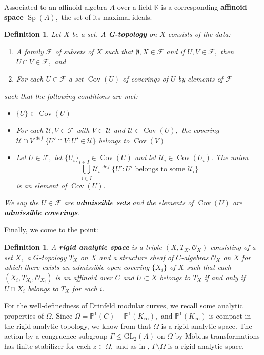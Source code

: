 \documentclass[11pt]{amsart}
\newtheorem{definition}[theorem]{Definition}
\theoremstyle{definition}
\numberwithin{equation}{section}
\newcommand{\GL}{\mathrm{GL}} 	%
\newcommand{\cO}{\mathcal{O}}		%
\newcommand{\cU}{\mathcal{U}}		%
\newcommand{\sF}{\mathscr{F}}		%
\newcommand{\bbK}{\mathbb{K}}		%
\newcommand{\bbP}{\mathbb{P}}		%
\begin{document}
		Associated to an affinoid algebra $A$ over a field $\bbK$ is a corresponding \textbf{affinoid space} $\operatorname{Sp}(A),$ the set of its maximal ideals. 
		
		\begin{definition}\cite[Definition $2.4.1$]{Frensel-vanderPut-Rigid-Analytic_Geom}
			Let $X$ be a set. A \textbf{G-topology} on $X$ consists of the data:
			\begin{enumerate}
				\item A family $\sF$ of subsets of $X$ such that $\emptyset, X\in \sF$ and if $U,V\in \sF,$ then $U\cap V\in \sF,$ and 
				\item For each $U\in \sF$ a set $\operatorname{Cov}(U)$ of coverings of $U$ by elements of $\sF$
			\end{enumerate}
			such that the following conditions are met:
			\begin{itemize}
				\item $\{U\}\in \operatorname{Cov}(U)$
				\item For each $\cU,V\in \sF$ with $V\subset \cU$ and $\cU\in \operatorname{Cov}(U),$ the covering $\displaystyle{\cU\cap V\overset{def}{=}\{U'\cap V: U'\in \cU\}}$ belongs to $\operatorname{Cov}(V)$
				\item Let $U\in \sF,$ let $\{U_i\}_{i\in I}\in \operatorname{Cov}(U)$ and let $\cU_i\in \operatorname{Cov}(U_i).$ The union \[\bigcup_{i\in I} \cU_i\overset{def}{=}\{U':U'\text{ belongs to some }\cU_i \}\] is an element of $\operatorname{Cov}(U).$
			\end{itemize}
			We say the $U\in \sF$ are \textbf{admissible sets} and the elements of $\operatorname{Cov}(U)$ are \textbf{admissible coverings}.
		\end{definition}
		
		Finally, we come to the point:
		\begin{definition}\cite[Definition $4.3.1$]{Frensel-vanderPut-Rigid-Analytic_Geom}
			A \textbf{rigid analytic space} is a triple $(X,T_X,\cO_X)$ consisting of a set $X,$ a $G$-topology $T_X$ on $X$ and a structure sheaf of $C$-algebras $\cO_X$ on $X$ for which there exists an admissible open covering $\{X_i\}$ of $X$ such that each $(X_i,T_{X_i},\cO_{X_i})$ is an affinoid over $C$ and $U\subset X$ belongs to $T_X$ if and only if $U\cap X_i$ belongs to $T_X$ for each $i.$ 
		\end{definition}
		
		For the well-definedness of Drinfeld modular curves, we recall some analytic properties of $\Omega.$
		Since $\Omega=\bbP^1(C)-\bbP^1(K_{\infty}),$ and $\bbP^1(K_{\infty})$ is compact in the rigid analytic topology, we know from \cite[Section $1.2$]{Gekeler-jacobians} that $\Omega$ is a rigid analytic space. The action by  a congruence subgroup $\Gamma\leq \GL_2(A)$ on $\Omega$ by M\"obius transformations has finite stabilizer for each $z\in \Omega,$ and as in \cite[Section  $(2.2)$]{Gekeler-jacobians}, $\Gamma\setminus \Omega$ is a rigid analytic space.\\
		
\end{document}
